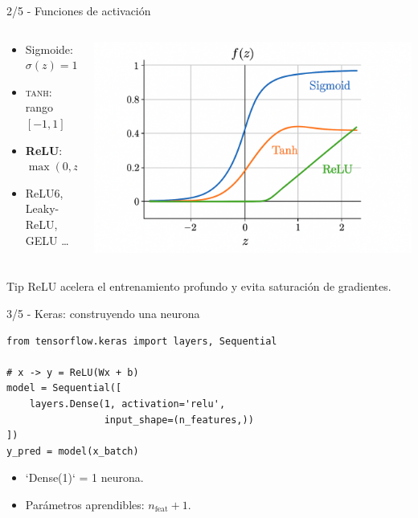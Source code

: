 \documentclass[8pt,spanish]{beamer}
\begin{document}
\begin{frame}[fragile]{2/5  -  Funciones de activación}
  \begin{columns}[T]
    \begin{column}{.48\textwidth}
      \begin{itemize}
        \item Sigmoide: $\sigma(z)=1/(1+e^{-z})$
        \item \textsc{tanh}: rango \([-1,1]\)
        \item \textbf{ReLU}: \(\max(0,z)\)
        \item ReLU6, Leaky-ReLU, GELU \ldots
      \end{itemize}
    \end{column}
    \begin{column}{.48\textwidth}
      \centering
      \includegraphics[width=\linewidth]{fun_activ.png}
    \end{column}
  \end{columns}
  \begin{block}{Tip}
    ReLU acelera el entrenamiento profundo y evita saturación de gradientes.
  \end{block}
\end{frame}

\begin{frame}[fragile]{3/5  -  Keras: construyendo una neurona}
  \begin{verbatim}
from tensorflow.keras import layers, Sequential

# x -> y = ReLU(Wx + b)
model = Sequential([
    layers.Dense(1, activation='relu',
                 input_shape=(n_features,))
])
y_pred = model(x_batch)
  \end{verbatim}
  \vspace{-1em}
  \begin{itemize}
    \item `Dense(1)` = 1 neurona.
    \item Parámetros aprendibles: \(n_\text{feat}+1\).
  \end{itemize}
\end{frame}
\end{document}
